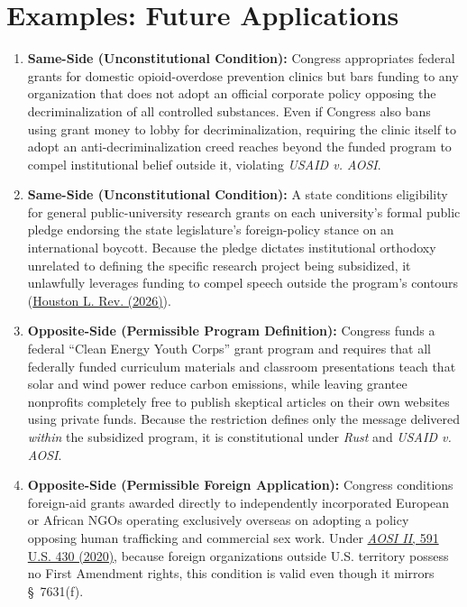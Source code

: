 \documentclass[12pt]{article}
\begin{document}
\section{Examples: Future Applications}
\begin{enumerate}
  \item \textbf{Same-Side (Unconstitutional Condition):} Congress appropriates federal grants for domestic opioid-overdose prevention clinics but bars funding to any organization that does not adopt an official corporate policy opposing the decriminalization of all controlled substances. Even if Congress also bans using grant money to lobby for decriminalization, requiring the clinic itself to adopt an anti-decriminalization creed reaches beyond the funded program to compel institutional belief outside it, violating \textit{USAID v. AOSI}.
  \item \textbf{Same-Side (Unconstitutional Condition):} A state conditions eligibility for general public-university research grants on each university's formal public pledge endorsing the state legislature's foreign-policy stance on an international boycott. Because the pledge dictates institutional orthodoxy unrelated to defining the specific research project being subsidized, it unlawfully leverages funding to compel speech outside the program's contours (\href{https://houstonlawreview.org/article/175172-coercion-conditions-and-campus-governance-columbia-university-and-the-constitutional-boundaries-of-federal-funding}{Houston L. Rev. (2026)}).
  \item \textbf{Opposite-Side (Permissible Program Definition):} Congress funds a federal ``Clean Energy Youth Corps'' grant program and requires that all federally funded curriculum materials and classroom presentations teach that solar and wind power reduce carbon emissions, while leaving grantee nonprofits completely free to publish skeptical articles on their own websites using private funds. Because the restriction defines only the message delivered \emph{within} the subsidized program, it is constitutional under \textit{Rust} and \textit{USAID v. AOSI}.
  \item \textbf{Opposite-Side (Permissible Foreign Application):} Congress conditions foreign-aid grants awarded directly to independently incorporated European or African NGOs operating exclusively overseas on adopting a policy opposing human trafficking and commercial sex work. Under \href{https://supreme.justia.com/cases/federal/us/591/19-177/}{\textit{AOSI II}, 591 U.S. 430 (2020)}, because foreign organizations outside U.S. territory possess no First Amendment rights, this condition is valid even though it mirrors \S~7631(f).

\end{enumerate}
\end{document}
